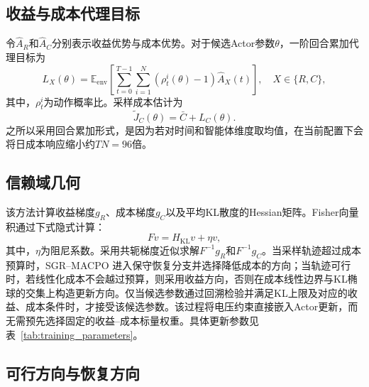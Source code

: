 \documentclass[final,5p,times]{elsarticle}
\newcommand{\method}{SGR--MACPO\xspace}
\begin{document}
\subsection{收益与成本代理目标}

令$\hat A_R$和$\hat A_C$分别表示收益优势与成本优势。对于候选Actor参数$\theta$，一阶回合累加代理目标为
\begin{equation}
 L_X(\theta)=\mathbb{E}_{\mathrm{env}}\left[
 \sum_{t=0}^{T-1}\sum_{i=1}^{N}
 \left(\rho_t^i(\theta)-1\right)\hat A_X(t)\right],
 \quad X\in\{R,C\},
\end{equation}
其中，$\rho_t^i$为动作概率比。采样成本估计为
\begin{equation}
 \widetilde J_C(\theta)=\bar C+L_C(\theta).
\end{equation}
之所以采用回合累加形式，是因为若对时间和智能体维度取均值，在当前配置下会将日成本响应缩小约$TN=96$倍。

\subsection{信赖域几何}

该方法计算收益梯度$g_R$、成本梯度$g_C$以及平均KL散度的Hessian矩阵。Fisher向量积通过下式隐式计算：
\begin{equation}
  \label{eq:fisher_vector_product}
  Fv = H_{\mathrm{KL}}v+\eta v,
\end{equation}
其中，$\eta$为阻尼系数。采用共轭梯度近似求解$F^{-1}g_R$和$F^{-1}g_C$。当采样轨迹超过成本预算时，\method 进入保守恢复分支并选择降低成本的方向；当轨迹可行时，若线性化成本不会越过预算，则采用收益方向，否则在成本线性边界与KL椭球的交集上构造更新方向。仅当候选参数通过回溯检验并满足KL上限及对应的收益、成本条件时，才接受该候选参数。该过程将电压约束直接嵌入Actor更新，而无需预先选择固定的收益--成本标量权重。具体更新参数见表~\ref{tab:training_parameters}。

\subsection{可行方向与恢复方向}
\label{sec:update_directions}
\end{document}
